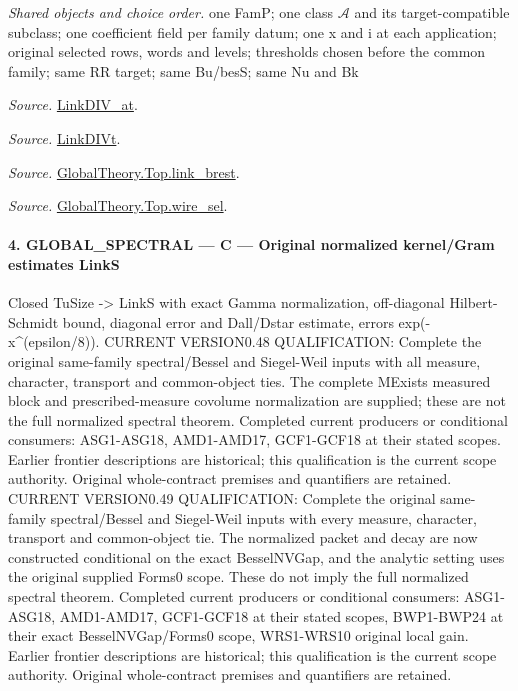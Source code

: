 \documentclass[11pt,a4paper]{article}
\numberwithin{equation}{section}
\theoremstyle{remark}\newtheorem{remark}[theorem]{Remark}
\begin{document}
\emph{Shared objects and choice order.} one FamP; one class $\mathcal A$ and its target-compatible subclass; one coefficient field per family datum; one x and i at each application; original selected rows, words and levels; thresholds chosen before the common family; same RR target; same Bu/besS; same Nu and Bk

\emph{Source.} \href{https://github.com/CocoSgt/riemann-hypothesis-lean/blob/7cbf7a0c32fca1badf05931879a37c3f8a2b03b4/src/Formalism/SharpRestriction/GlobalTheoremInputs.lean#L77-L90}{LinkDIV\_\allowbreak at}.

\emph{Source.} \href{https://github.com/CocoSgt/riemann-hypothesis-lean/blob/7cbf7a0c32fca1badf05931879a37c3f8a2b03b4/src/Formalism/SharpRestriction/GlobalTheoremInputs.lean#L94-L96}{LinkDIVt}.

\emph{Source.} \href{https://github.com/CocoSgt/riemann-hypothesis-lean/blob/7cbf7a0c32fca1badf05931879a37c3f8a2b03b4/src/Development/AbelianVarietyTheory/Proofs/GlobalInterpolation/LinkBrest.lean#L7-L25}{GlobalTheory.Top.link\_\allowbreak brest}.

\emph{Source.} \href{https://github.com/CocoSgt/riemann-hypothesis-lean/blob/7cbf7a0c32fca1badf05931879a37c3f8a2b03b4/src/Development/AbelianVarietyTheory/Proofs/GlobalInterpolation/WireSel.lean#L11-L41}{GlobalTheory.Top.wire\_\allowbreak sel}.



\paragraph{4. GLOBAL\_\allowbreak SPECTRAL — C — Original normalized kernel/Gram estimates LinkS}

Closed TuSize -> LinkS with exact Gamma normalization, off-diagonal Hilbert-Schmidt bound, diagonal error and Dall/Dstar estimate, errors exp(-x\textasciicircum{}(epsilon/8)). CURRENT VERSION0.48 QUALIFICATION: Complete the original same-family spectral/Bessel and Siegel-Weil inputs with all measure, character, transport and common-object ties. The complete MExists measured block and prescribed-measure covolume normalization are supplied; these are not the full normalized spectral theorem. Completed current producers or conditional consumers: ASG1-ASG18, AMD1-AMD17, GCF1-GCF18 at their stated scopes. Earlier frontier descriptions are historical; this qualification is the current scope authority. Original whole-contract premises and quantifiers are retained. CURRENT VERSION0.49 QUALIFICATION: Complete the original same-family spectral/Bessel and Siegel-Weil inputs with every measure, character, transport and common-object tie. The normalized packet and decay are now constructed conditional on the exact BesselNVGap, and the analytic setting uses the original supplied Forms0 scope. These do not imply the full normalized spectral theorem. Completed current producers or conditional consumers: ASG1-ASG18, AMD1-AMD17, GCF1-GCF18 at their stated scopes, BWP1-BWP24 at their exact BesselNVGap/Forms0 scope, WRS1-WRS10 original local gain. Earlier frontier descriptions are historical; this qualification is the current scope authority. Original whole-contract premises and quantifiers are retained.
\end{document}
